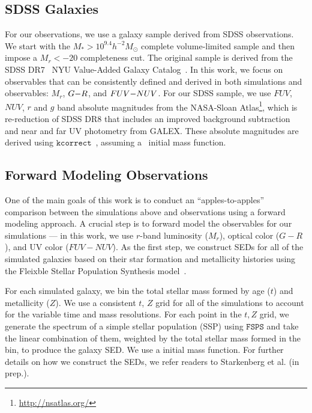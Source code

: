 \subsection{SDSS Galaxies} \label{sec:obs} 
For our observations, we use a galaxy sample derived from SDSS observations. We
start with the $M_* > 10^{9.4} h^{-2}M_\odot$ complete \cite{tinker2011}
volume-limited sample and then impose a $M_r < -20$ completeness cut. 
The original \cite{tinker2011} sample is derived from the SDSS DR7~\citep{abazajian2009} NYU
Value-Added Galaxy Catalog~\citep[VAGC;][]{blanton2005}. In this work, we focus 
on observables that can be consistently defined and derived in both simulations 
and observables: $M_r$, $G{-}R$, and $FUV{-}NUV$. For our SDSS sample, we use $FUV$,
$NUV$, $r$ and $g$ band absolute magnitudes from the NASA-Sloan
Atlas\footnote{\url{http://nsatlas.org/}}, which is re-reduction of SDSS DR8
\citep{aihara2011} that includes an improved background subtraction~\citep{blanton2011} 
and near and far UV photometry from GALEX. These absolute magnitudes are
derived using $\mathtt{kcorrect}$~\citep{blanton2007a}, assuming
a~\cite{chabrier2003} initial mass function. 

\subsection{Forward Modeling Observations} \label{sec:fm} 
One of the main goals of this work is to conduct an ``apples-to-apples'' comparison
between the simulations above and observations using a forward modeling
approach. A crucial step is to forward model the observables for our
simulations --- in this work, we use $r$-band luminosity ($M_r$), optical color ($G-R$), and 
UV color ($FUV-NUV$). As the first step, we construct SEDs for all
of the simulated galaxies based on their star formation and metallicity histories
using the Fleixble Stellar Population Synthesis model~\citep[$\mathtt{FSPS}$;][]{conroy2009, conroy2010}. 

For each simulated galaxy, we bin the total stellar mass formed by age ($t$)
and metallicity ($Z$). We use a consistent $t$, $Z$ grid for all of the simulations
to account for the variable time and mass resolutions. For each point in the
$t, Z$ grid, we generate the spectrum of a simple stellar population (SSP)
using $\mathtt{FSPS}$ and take the linear combination of them, weighted by 
the total stellar mass formed in the bin, to produce the galaxy SED. We use a
\cite{chabrier2003} initial mass function. For further details on how we
construct the SEDs, we refer readers to Starkenberg et al. (in prep.).

